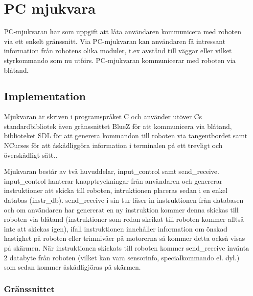 \section{PC mjukvara}
PC-mjukvaran har som uppgift att låta användaren kommunicera med roboten via ett
enkelt gränssnitt. Via PC-mjukvaran kan användaren få intressant information
från robotens olika moduler, t.ex avstånd till väggar eller vilket styrkommando
som nu utförs. PC-mjukvaran kommunicerar med roboten via blåtand.

\subsection{Implementation}

Mjukvaran är skriven i programspråket C och använder utöver Cs standardbibliotek
även gränssnittet BlueZ för att kommunicera via blåtand, biblioteket SDL för att
generera kommandon till roboten via tangentbordet samt NCurses för att
åskådliggöra information i terminalen på ett trevligt och överskådligt sätt..

Mjukvaran består av två huvuddelar, input\_control samt send\_receive. input\_control
hanterar knapptryckningar från användaren och genererar instruktioner att skicka
till roboten, intruktionen placeras sedan i en enkel databas (instr\_db).
send\_receive i sin tur läser in instruktionen från databasen och om användaren
har genererat en ny instruktion kommer denna skickas till roboten via blåtand
(instruktioner som redan skcikat till roboten kommer alltså inte att skickas
 igen), ifall instruktionen innehåller information om önskad hastighet på
roboten eller trimnivåer på motorerna så kommer detta också visas på skärmen.
När instruktionen skickats till roboten kommer send\_receive invänta 2 databyte
från roboten (vilket kan vara sensorinfo, specialkommando el. dyl.) som sedan
kommer åskådligjöras på skärmen.

\subsubsection{Gränssnittet}

